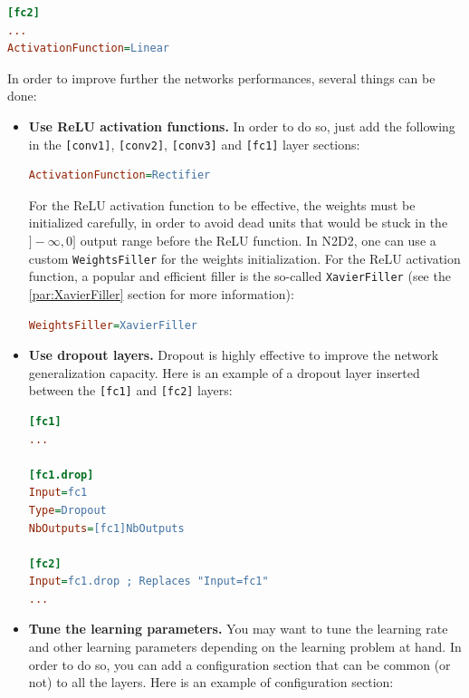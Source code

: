 \documentclass[a4paper,11pt,oneside]{article}
\newenvironment{myitemize}
{ \begin{itemize}
    \setlength{\itemsep}{0pt}
    \setlength{\parskip}{0pt}
    \setlength{\parsep}{0pt}     }
{ \end{itemize}                  }
\begin{document}
\begin{lstlisting}[language=ini]
[fc2]
...
ActivationFunction=Linear
\end{lstlisting}

In order to improve further the networks performances, several things can be
done:

\begin{myitemize}
\item \textbf{Use ReLU activation functions.}
In order to do so, just add the following
in the \lstinline![conv1]!,  \lstinline![conv2]!, \lstinline![conv3]! and
\lstinline![fc1]! layer sections:

\begin{lstlisting}[language=ini]
ActivationFunction=Rectifier
\end{lstlisting}

For the ReLU activation function to be effective, the weights must be
initialized carefully, in order to avoid dead units that would be stuck in the
$]-\infty,0]$ output range before the ReLU function. In N2D2, one can use a
custom \lstinline!WeightsFiller! for the weights initialization. For the ReLU
activation function, a popular and efficient filler is the so-called
\lstinline!XavierFiller! (see the \ref{par:XavierFiller} section for more
information):

\begin{lstlisting}[language=ini]
WeightsFiller=XavierFiller
\end{lstlisting}

\item \textbf{Use dropout layers.}
Dropout is highly effective to improve the network
generalization capacity. Here is an example of a dropout layer inserted between
the \lstinline![fc1]! and \lstinline![fc2]! layers:

\begin{lstlisting}[language=ini]
[fc1]
...

[fc1.drop]
Input=fc1
Type=Dropout
NbOutputs=[fc1]NbOutputs

[fc2]
Input=fc1.drop ; Replaces "Input=fc1"
...
\end{lstlisting}

\item \textbf{Tune the learning parameters.}
You may want to tune the learning rate and other learning parameters depending
on the learning problem at hand. In order to do so, you can add a configuration
section that can be common (or not) to all the layers. Here is an example of
configuration section:


\end{myitemize}
\end{document}
